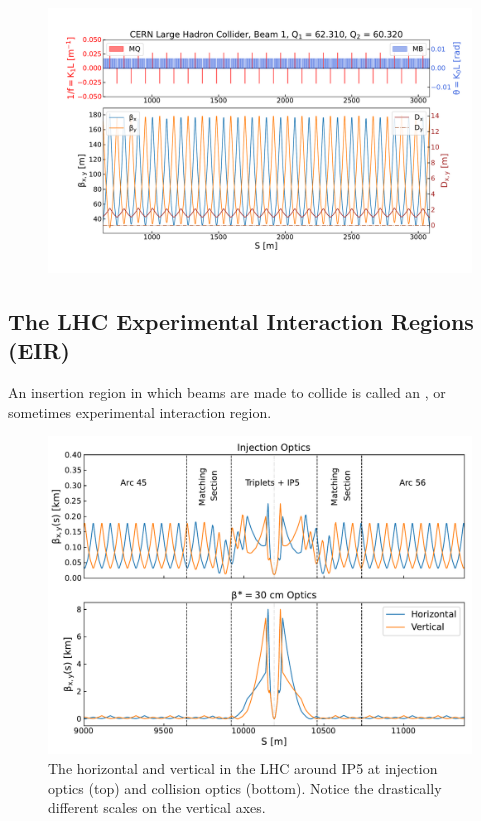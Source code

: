 \begin{figure}[!hbt]
  \centering
  \includegraphics*[width=0.9\linewidth]{Figures/Optics_Measurements_Corrections_at_LHC/lhc_arc23.pdf}
  \caption{}
  \label{figure:lhc_arc23}
\end{figure}

\subsection{The LHC Experimental Interaction Regions (EIR)}
\label{subsection:lhc_eirs}

An insertion region in which beams are made to collide is called an , or sometimes experimental interaction region.


\begin{figure}[!hbt]
  \centering
  \includegraphics*[width=0.9\linewidth]{Figures/Optics_Measurements_Corrections_at_LHC/ir5_surroundings_optics_2.pdf}
  \caption{The horizontal and vertical \betafunctions in the LHC around IP5 at injection optics (top) and collision optics (bottom). Notice the drastically different scales on the vertical axes.}
  \label{figure:ir5_and_around}
\end{figure}

